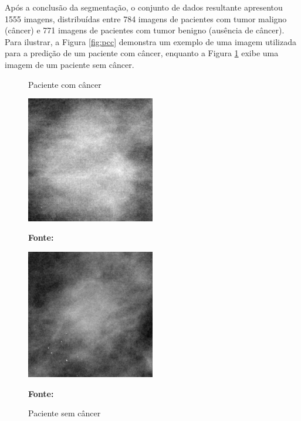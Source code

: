 Após a conclusão da segmentação, o conjunto de dados resultante apresentou 1555 imagens, distribuídas entre 784 imagens de pacientes com tumor maligno (câncer) e 771 imagens de pacientes com tumor benigno (ausência de câncer). Para ilustrar, a Figura \ref{fig:pcc} demonstra um exemplo de uma imagem utilizada para a predição de um paciente com câncer, enquanto a Figura \ref{fig:psc} exibe uma imagem de um paciente sem câncer. 


\begin{figure}[ht]
\centering
    \begin{minipage}[b]{0.45\textwidth}
        \centering
        \caption{Paciente com câncer}
        \includegraphics[width=0.5\textwidth]{figuras/with_cancer.jpg}
        \label{fig:pcc}
        
        \textbf{\footnotesize Fonte: \href{https://www.kaggle.com/datasets/awsaf49/cbis-ddsm-breast-cancer-image-dataset}{\cite{newdatabase}}}
    \end{minipage}
    \hfill
    \begin{minipage}[b]{0.45\textwidth}
        \centering
        \caption{Paciente sem câncer}
        \includegraphics[width=0.5\textwidth]{figuras/without_cancer.jpg}
        \label{fig:psc}
        
        \textbf{\footnotesize Fonte: \href{https://www.kaggle.com/datasets/awsaf49/cbis-ddsm-breast-cancer-image-dataset}{\cite{newdatabase}}}
    \end{minipage}
\end{figure}


